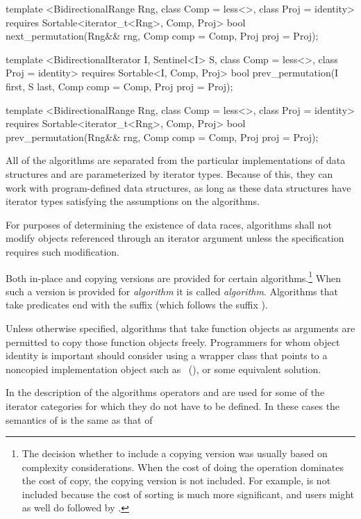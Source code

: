 \begin{codeblock}
{{{{  template <BidirectionalRange Rng, class Comp = less<>,
      class Proj = identity>
    requires Sortable<iterator_t<Rng>, Comp, Proj>
    bool
      next_permutation(Rng&& rng, Comp comp = Comp{}, Proj proj = Proj{});

  template <BidirectionalIterator I, Sentinel<I> S, class Comp = less<>,
      class Proj = identity>
    requires Sortable<I, Comp, Proj>
    bool prev_permutation(I first, S last, Comp comp = Comp{}, Proj proj = Proj{});

  template <BidirectionalRange Rng, class Comp = less<>,
      class Proj = identity>
    requires Sortable<iterator_t<Rng>, Comp, Proj>
    bool
      prev_permutation(Rng&& rng, Comp comp = Comp{}, Proj proj = Proj{});
}}}}
\end{codeblock}

\pnum
All of the algorithms are separated from the particular implementations of data structures and are
parameterized by iterator types.
Because of this, they can work with program-defined data structures, as long
as these data structures have iterator types satisfying the assumptions on the algorithms.

\pnum
For purposes of determining the existence of data races, algorithms shall
not modify objects referenced through an iterator argument unless the
specification requires such modification.

\pnum
Both in-place and copying versions are provided for certain
algorithms.\footnote{The decision whether to include a copying version was
usually based on complexity considerations. When the cost of doing the operation
dominates the cost of copy, the copying version is not included. For example,
 is not included because the cost of sorting is much more
significant, and users might as well do  followed by .}
When such a version is provided for \textit{algorithm} it is called
\textit{algorithm}. Algorithms that take predicates end with the
suffix  (which follows the suffix ).

\pnum
\enternote
Unless otherwise specified, algorithms that take function objects as arguments
are permitted to copy those function objects freely. Programmers for whom object
identity is important should consider using a wrapper class that points to a
noncopied implementation object such as ~(), or some equivalent solution.
\exitnote

\pnum
In the description of the algorithms operators
\tcode{+}
and
\tcode{-}
are used for some of the iterator categories for which
they do not have to be defined.
In these cases the semantics of
is the same as that of

